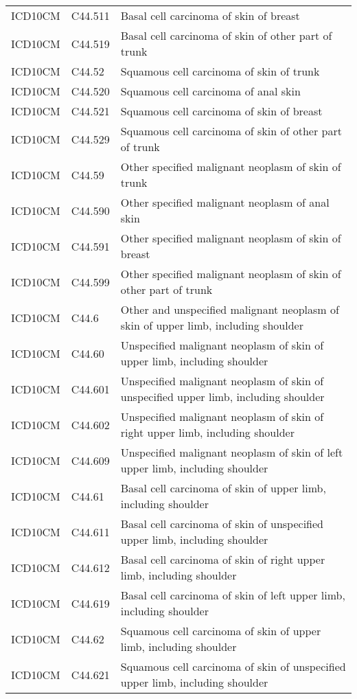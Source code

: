 \begin{longtable}{p{}p{}p{}}
  ICD10CM & C44.511 & Basal cell carcinoma of skin of breast \\ 
  ICD10CM & C44.519 & Basal cell carcinoma of skin of other part of trunk \\ 
  ICD10CM & C44.52 & Squamous cell carcinoma of skin of trunk \\ 
  ICD10CM & C44.520 & Squamous cell carcinoma of anal skin \\ 
  ICD10CM & C44.521 & Squamous cell carcinoma of skin of breast \\ 
  ICD10CM & C44.529 & Squamous cell carcinoma of skin of other part of trunk \\ 
  ICD10CM & C44.59 & Other specified malignant neoplasm of skin of trunk \\ 
  ICD10CM & C44.590 & Other specified malignant neoplasm of anal skin \\ 
  ICD10CM & C44.591 & Other specified malignant neoplasm of skin of breast \\ 
  ICD10CM & C44.599 & Other specified malignant neoplasm of skin of other part of trunk \\ 
  ICD10CM & C44.6 & Other and unspecified malignant neoplasm of skin of upper limb, including shoulder \\ 
  ICD10CM & C44.60 & Unspecified malignant neoplasm of skin of upper limb, including shoulder \\ 
  ICD10CM & C44.601 & Unspecified malignant neoplasm of skin of unspecified upper limb, including shoulder \\ 
  ICD10CM & C44.602 & Unspecified malignant neoplasm of skin of right upper limb, including shoulder \\ 
  ICD10CM & C44.609 & Unspecified malignant neoplasm of skin of left upper limb, including shoulder \\ 
  ICD10CM & C44.61 & Basal cell carcinoma of skin of upper limb, including shoulder \\ 
  ICD10CM & C44.611 & Basal cell carcinoma of skin of unspecified upper limb, including shoulder \\ 
  ICD10CM & C44.612 & Basal cell carcinoma of skin of right upper limb, including shoulder \\ 
  ICD10CM & C44.619 & Basal cell carcinoma of skin of left upper limb, including shoulder \\ 
  ICD10CM & C44.62 & Squamous cell carcinoma of skin of upper limb, including shoulder \\ 
  ICD10CM & C44.621 & Squamous cell carcinoma of skin of unspecified upper limb, including shoulder \\ 

\end{longtable}

